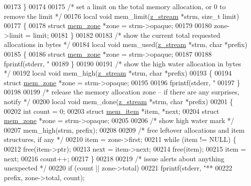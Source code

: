 \begin{DoxyCode}
00173 \}
00174 
00175 \textcolor{comment}{/* set a limit on the total memory allocation, or 0 to remove the limit */}
00176 local \textcolor{keywordtype}{void} mem\_limit(\hyperlink{structz__stream__s}{z\_stream} *strm, \textcolor{keywordtype}{size\_t} limit)
00177 \{
00178     \textcolor{keyword}{struct }\hyperlink{structmem__zone}{mem\_zone} *zone = strm->opaque;
00179 
00180     zone->limit = limit;
00181 \}
00182 
00183 \textcolor{comment}{/* show the current total requested allocations in bytes */}
00184 local \textcolor{keywordtype}{void} mem\_used(\hyperlink{structz__stream__s}{z\_stream} *strm, \textcolor{keywordtype}{char} *prefix)
00185 \{
00186     \textcolor{keyword}{struct }\hyperlink{structmem__zone}{mem\_zone} *zone = strm->opaque;
00187 
00188     fprintf(stderr, \textcolor{stringliteral}{"%
00189 \}
00190 
00191 \textcolor{comment}{/* show the high water allocation in bytes */}
00192 local \textcolor{keywordtype}{void} mem\_high(\hyperlink{structz__stream__s}{z\_stream} *strm, \textcolor{keywordtype}{char} *prefix)
00193 \{
00194     \textcolor{keyword}{struct }\hyperlink{structmem__zone}{mem\_zone} *zone = strm->opaque;
00195 
00196     fprintf(stderr, \textcolor{stringliteral}{"%
00197 \}
00198 
00199 \textcolor{comment}{/* release the memory allocation zone -- if there are any surprises, notify */}
00200 local \textcolor{keywordtype}{void} mem\_done(\hyperlink{structz__stream__s}{z\_stream} *strm, \textcolor{keywordtype}{char} *prefix)
00201 \{
00202     \textcolor{keywordtype}{int} count = 0;
00203     \textcolor{keyword}{struct }\hyperlink{structmem__item}{mem\_item} *item, *next;
00204     \textcolor{keyword}{struct }\hyperlink{structmem__zone}{mem\_zone} *zone = strm->opaque;
00205 
00206     \textcolor{comment}{/* show high water mark */}
00207     mem\_high(strm, prefix);
00208 
00209     \textcolor{comment}{/* free leftover allocations and item structures, if any */}
00210     item = zone->first;
00211     \textcolor{keywordflow}{while} (item != NULL) \{
00212         free(item->ptr);
00213         next = item->next;
00214         free(item);
00215         item = next;
00216         count++;
00217     \}
00218 
00219     \textcolor{comment}{/* issue alerts about anything unexpected */}
00220     \textcolor{keywordflow}{if} (count || zone->total)
00221         fprintf(stderr, \textcolor{stringliteral}{"** %
00222                 prefix, zone->total, count);
}}}
\end{DoxyCode}
